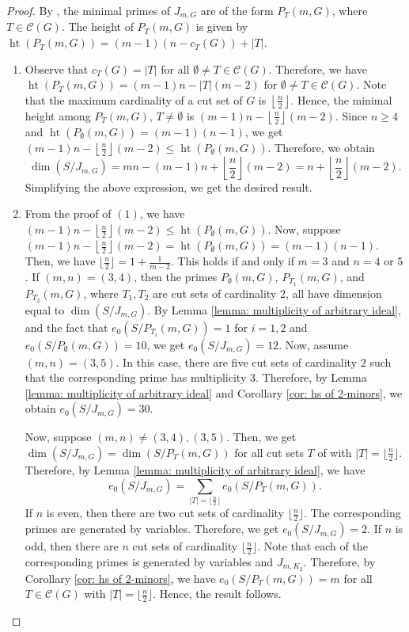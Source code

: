 \documentclass[12pt,reqno]{amsart}
\DeclareMathOperator{\height}{ht}
\theoremstyle{plain}
\theoremstyle{definition}
\begin{document}
 \begin{proof}
     By \cite[Theorem 7]{GBI-Rauh-2013}, the minimal primes of $J_{m,G}$ are of the form $P_T(m,G)$, where $T\in \mathscr{C}(G)$. The height of $P_T(m,G)$ is given by $\height(P_T(m,G))=(m-1)(n-c_T(G))+|T|.$ 
     \begin{enumerate}
         \item 
     Observe that $c_T(G)=|T|$ for all $\emptyset \neq T\in \mathscr{C}(G)$. Therefore, we have $\height(P_{T}(m,G))=(m-1)n-|T|(m-2)$ for $\emptyset \neq T\in \mathscr{C}(G)$. Note that the maximum cardinality of a cut set of \(G\) is \(\left\lfloor\frac{n}{2}\right\rfloor\). Hence, the minimal height among $P_T(m,G)$, $T\neq \emptyset$ is $(m-1)n-\left\lfloor\frac{n}{2}\right\rfloor(m-2)$. Since $n\geq 4$ and $\height(P_{\emptyset}(m,G))=(m-1)(n-1)$, we get $(m-1)n-\left\lfloor\frac{n}{2}\right\rfloor(m-2)\leq \height(P_{\emptyset}(m,G))$. Therefore, we obtain $$\dim(S/J_{m,G})=mn-(m-1)n+\left\lfloor\frac{n}{2}\right\rfloor(m-2)=n+\left\lfloor\frac{n}{2}\right\rfloor(m-2).$$ Simplifying the above expression, we get the desired result.
     \item From the proof of $(1)$, we have $(m-1)n-\left\lfloor\frac{n}{2}\right\rfloor(m-2)\leq \height(P_{\emptyset}(m,G)).$ Now, suppose $(m-1)n-\left\lfloor\frac{n}{2}\right\rfloor(m-2)= \height(P_{\emptyset}(m,G))=(m-1)(n-1)$. Then, we have $\lfloor\frac{n}{2}\rfloor=1+\frac{1}{m-2}$. This holds if and only if $m=3$ and $ n=4$ or $5$. If \((m,n)=(3,4)\), then the primes \(P_{\emptyset}(m,G)\), \(P_{T_1}(m,G)\), and \(P_{T_2}(m,G)\), where \(T_1,T_2\) are cut sets of cardinality \(2\), all have dimension equal to \(\dim(S/J_{m,G})\).
 By Lemma \ref{lemma: multiplicity of arbitrary ideal}, and the fact that $e_0(S/P_{T_i}(m,G))=1$ for $i=1,2$ and $e_0(S/P_{\emptyset}(m,G))=10$, we get $e_0(S/J_{m,G})=12$. Now, assume $(m,n)=(3,5)$. In this case, there are five cut sets of cardinality $2$ such that the corresponding prime has multiplicity $3$. Therefore, by Lemma \ref{lemma: multiplicity of arbitrary ideal} and Corollary \ref{cor: hs of 2-minors}, we obtain $e_0(S/J_{m,G})=30$. 

     Now, suppose $(m,n)\neq (3,4),(3,5)$. Then, we get $\dim(S/J_{m,G})=\dim(S/P_T(m,G))$ for all cut sets $T$ of with $|T|=\lfloor\frac{n}{2}\rfloor$. Therefore, by Lemma \ref{lemma: multiplicity of arbitrary ideal}, we have $$e_0(S/J_{m,G})=\sum_{|T|=\lfloor\frac{n}{2}\rfloor}e_0(S/P_T(m,G)).$$
     If $n$ is even, then there are two cut sets of cardinality $\lfloor\frac{n}{2}\rfloor$. The corresponding primes are generated by variables. Therefore, we get $e_0(S/J_{m,G})=2$. If $n$ is odd, then there are $n$ cut sets of cardinality $\lfloor\frac{n}{2}\rfloor$. Note that each of the corresponding primes is generated by variables and $J_{m,K_2}$. Therefore, by Corollary \ref{cor: hs of 2-minors}, we have $e_0(S/P_T(m,G))=m$ for all $T\in \mathscr{C}(G)$ with $|T|=\lfloor\frac{n}{2}\rfloor$. Hence, the result follows.  
     \end{enumerate} 
 \end{proof}
\end{document}
